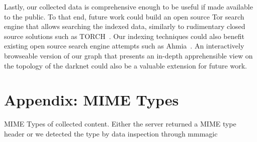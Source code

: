 \documentclass[USenglish,oneside,twocolumn]{article}
\begin{document}
Lastly, our collected data is comprehensive enough to be useful if made available to the public. To that end, future work could build an open source Tor search engine that allows searching the indexed data, similarly to rudimentary closed source solutions such as TORCH~\cite{torch}. Our indexing techniques could also benefit existing open source search engine attempts such as Ahmia~\cite{ahmia}. An interactively browseable version of our graph that presents an in-depth apprehensible view on the topology of the darknet could also be a valuable extension for future work.

\newpage

\printbibliography

\appendix
%
%
\section{Appendix: MIME Types}
\label{appendix:A}
MIME Types of collected content. Either the server returned a MIME type header or we detected the type by data inspection through mmmagic\cite{mscdex}
\end{document}
